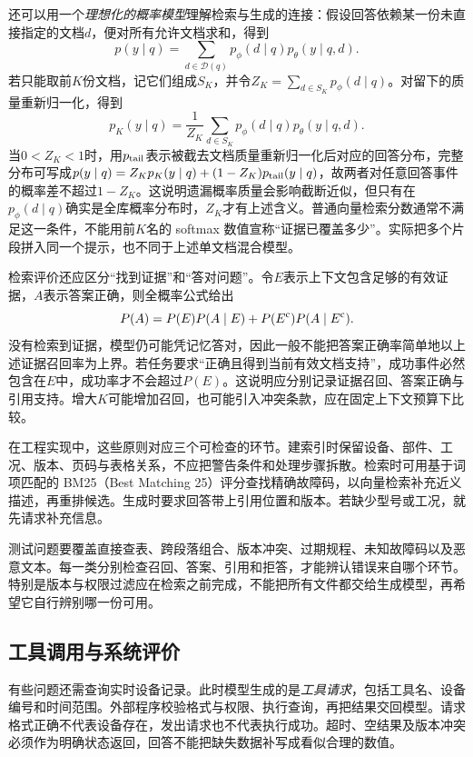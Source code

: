 还可以用一个\emph{理想化的概率模型}理解检索与生成的连接：假设回答依赖某一份未直接指定的文档$d$，便对所有允许文档求和，得到
\begin{equation}
 p(y\mid q)=\sum_{d\in\mathcal D(q)}p_\phi(d\mid q)p_\theta(y\mid q,d).
\end{equation}
若只能取前$K$份文档，记它们组成$S_K$，并令$Z_K=\sum_{d\in S_K}p_\phi(d\mid q)$。对留下的质量重新归一化，得到
\begin{equation}
 p_K(y\mid q)=\frac1{Z_K}\sum_{d\in S_K}p_\phi(d\mid q)p_\theta(y\mid q,d).
\end{equation}
当$0<Z_K<1$时，用$p_{\rm tail}$表示被截去文档质量重新归一化后对应的回答分布，完整分布可写成$p(y\mid q)=Z_Kp_K(y\mid q)+(1-Z_K)p_{\rm tail}(y\mid q)$，故两者对任意回答事件的概率差不超过$1-Z_K$。这说明遗漏概率质量会影响截断近似，但只有在$p_\phi(d\mid q)$确实是全库概率分布时，$Z_K$才有上述含义。普通向量检索分数通常不满足这一条件，不能用前$K$名的 softmax 数值宣称“证据已覆盖多少”。实际把多个片段拼入同一个提示，也不同于上述单文档混合模型。

检索评价还应区分“找到证据”和“答对问题”。令$E$表示上下文包含足够的有效证据，$A$表示答案正确，则全概率公式给出
\begin{equation}
 P(A)=P(E)P(A\mid E)+P(E^{\rm c})P(A\mid E^{\rm c}).
\end{equation}
没有检索到证据，模型仍可能凭记忆答对，因此一般不能把答案正确率简单地以上述证据召回率为上界。若任务要求“正确且得到当前有效文档支持”，成功事件必然包含在$E$中，成功率才不会超过$P(E)$。这说明应分别记录证据召回、答案正确与引用支持。增大$K$可能增加召回，也可能引入冲突条款，应在固定上下文预算下比较。

在工程实现中，这些原则对应三个可检查的环节。建索引时保留设备、部件、工况、版本、页码与表格关系，不应把警告条件和处理步骤拆散。检索时可用基于词项匹配的 BM25（Best Matching 25）评分查找精确故障码，以向量检索补充近义描述，再重排候选。生成时要求回答带上引用位置和版本。若缺少型号或工况，就先请求补充信息。

测试问题要覆盖直接查表、跨段落组合、版本冲突、过期规程、未知故障码以及恶意文本。每一类分别检查召回、答案、引用和拒答，才能辨认错误来自哪个环节。特别是版本与权限过滤应在检索之前完成，不能把所有文件都交给生成模型，再希望它自行辨别哪一份可用。

\subsection{工具调用与系统评价}
有些问题还需查询实时设备记录。此时模型生成的是\emph{工具请求}，包括工具名、设备编号和时间范围。外部程序校验格式与权限、执行查询，再把结果交回模型。请求格式正确不代表设备存在，发出请求也不代表执行成功。超时、空结果及版本冲突必须作为明确状态返回，回答不能把缺失数据补写成看似合理的数值。

